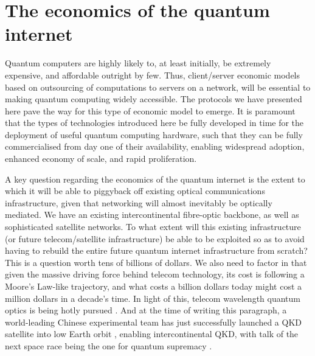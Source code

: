 \documentclass[aps,rmp,twocolumn,amsmath,amssymb,nofootinbib,superscriptaddress,longbibliography,floatfix]{revtex4-1}
\newcommand{\comment}[1]{{\color{blue}{\textbf{#1}}}}
\begin{document}

%
%

\section{The economics of the quantum internet} \label{sec:economics}

Quantum computers are highly likely to, at least initially, be extremely expensive, and affordable outright by few. Thus, client/server economic models based on outsourcing of computations to servers on a network, will be essential to making quantum computing widely accessible. The protocols we have presented here pave the way for this type of economic model to emerge. It is paramount that the types of technologies introduced here be fully developed in time for the deployment of useful quantum computing hardware, such that they can be fully commercialised from day one of their availability, enabling widespread adoption, enhanced economy of scale, and rapid proliferation.

A key question regarding the economics of the quantum internet is the extent to which it will be able to piggyback off existing optical communications infrastructure, given that networking will almost inevitably be optically mediated. We have an existing intercontinental fibre-optic backbone, as well as sophisticated satellite networks. To what extent will this existing infrastructure (or future telecom/satellite infrastructure) be able to be exploited so as to avoid having to rebuild the entire future quantum internet infrastructure from scratch? This is a question worth tens of billions of dollars. We also need to factor in that given the massive driving force behind telecom technology, its cost is following a Moore's Law-like trajectory, and what costs a billion dollars today might cost a million dollars in a decade's time. In light of this, telecom wavelength quantum optics is being hotly pursued \cite{???}. And at the time of writing this paragraph, a world-leading Chinese experimental team has just successfully launched a QKD satellite into low Earth orbit \cite{???}, enabling intercontinental QKD, with talk of the next space race being the one for quantum supremacy \cite{???}.
\end{document}
